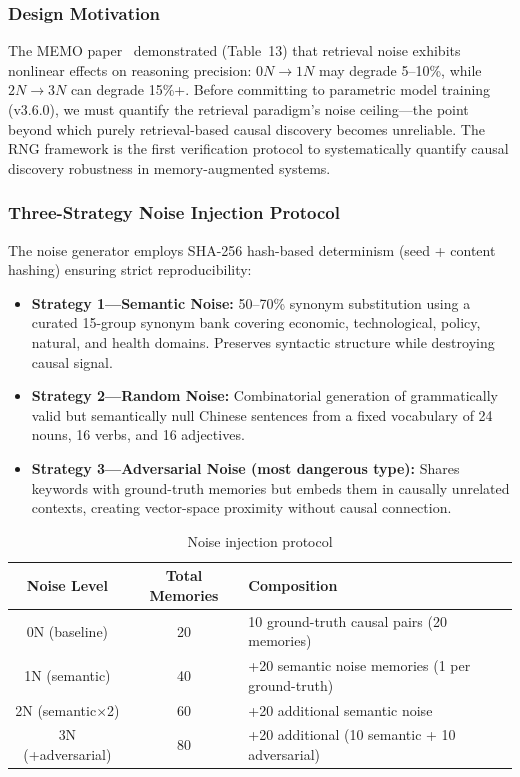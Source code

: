 \documentclass[11pt,a4paper]{article}
\begin{document}
\subsubsection{Design Motivation}

The MEMO paper~\cite{memo2025} demonstrated (Table~13) that retrieval noise exhibits nonlinear effects on reasoning precision: \(0N \to 1N\) may degrade 5--10\%, while \(2N \to 3N\) can degrade 15\%+. Before committing to parametric model training (v3.6.0), we must quantify the retrieval paradigm's noise ceiling---the point beyond which purely retrieval-based causal discovery becomes unreliable. The RNG framework is the first verification protocol to systematically quantify causal discovery robustness in memory-augmented systems.

\subsubsection{Three-Strategy Noise Injection Protocol}

The noise generator employs SHA-256 hash-based determinism (seed + content hashing) ensuring strict reproducibility:

\begin{itemize}[itemsep=2pt]
    \item \textbf{Strategy 1---Semantic Noise:} 50--70\% synonym substitution using a curated 15-group synonym bank covering economic, technological, policy, natural, and health domains. Preserves syntactic structure while destroying causal signal.
    \item \textbf{Strategy 2---Random Noise:} Combinatorial generation of grammatically valid but semantically null Chinese sentences from a fixed vocabulary of 24 nouns, 16 verbs, and 16 adjectives.
    \item \textbf{Strategy 3---Adversarial Noise (most dangerous type):} Shares keywords with ground-truth memories but embeds them in causally unrelated contexts, creating vector-space proximity without causal connection.
\end{itemize}

\begin{table}[H]
\centering
\caption{Noise injection protocol}
\label{tab:noise_protocol}
\begin{tabular}{ccl}
\toprule
\textbf{Noise Level} & \textbf{Total Memories} & \textbf{Composition} \\
\midrule
0N (baseline)    & 20  & 10 ground-truth causal pairs (20 memories) \\
1N (semantic)    & 40  & +20 semantic noise memories (1 per ground-truth) \\
2N (semantic\(\times\)2) & 60  & +20 additional semantic noise \\
3N (+adversarial) & 80  & +20 additional (10 semantic + 10 adversarial) \\
\bottomrule
\end{tabular}
\end{table}
\end{document}
